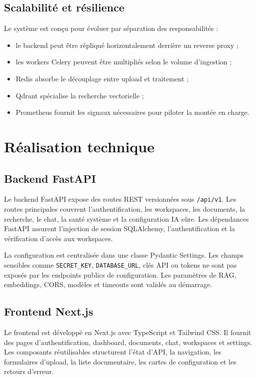 \documentclass[12pt,a4paper,oneside]{report}
\begin{document}
\section{Scalabilité et résilience}
Le système est conçu pour évoluer par séparation des responsabilités :
\begin{itemize}
  \item le backend peut être répliqué horizontalement derrière un reverse proxy ;
  \item les workers Celery peuvent être multipliés selon le volume d'ingestion ;
  \item Redis absorbe le découplage entre upload et traitement ;
  \item Qdrant spécialise la recherche vectorielle ;
  \item Prometheus fournit les signaux nécessaires pour piloter la montée en charge.
\end{itemize}

\chapter{Réalisation technique}

\section{Backend FastAPI}
Le backend FastAPI expose des routes REST versionnées sous \texttt{/api/v1}. Les routes principales couvrent l'authentification, les workspaces, les documents, la recherche, le chat, la santé système et la configuration IA sûre. Les dépendances FastAPI assurent l'injection de session SQLAlchemy, l'authentification et la vérification d'accès aux workspaces.

La configuration est centralisée dans une classe Pydantic Settings. Les champs sensibles comme \texttt{SECRET\_KEY}, \texttt{DATABASE\_URL}, clés API ou tokens ne sont pas exposés par les endpoints publics de configuration. Les paramètres de RAG, embeddings, CORS, modèles et timeouts sont validés au démarrage.

\section{Frontend Next.js}
Le frontend est développé en Next.js avec TypeScript et Tailwind CSS. Il fournit des pages d'authentification, dashboard, documents, chat, workspaces et settings. Les composants réutilisables structurent l'état d'API, la navigation, les formulaires d'upload, la liste documentaire, les cartes de configuration et les retours d'erreur.
\end{document}

